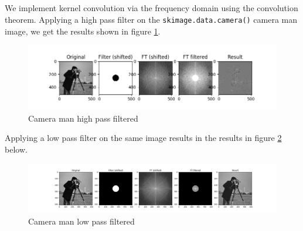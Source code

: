 \documentclass[]{article}
\begin{document}
\subsection{}
We implement kernel convolution via the frequency domain using the convolution theorem. Applying a high pass filter on the \texttt{skimage.data.camera()} camera man image, we get the results shown in figure \ref{fig:cameraman_hp}.
\begin{figure}[H]
\centering
\includegraphics[width=\textwidth]{camera_hp_verbose}
\caption{Camera man high pass filtered}
\label{fig:cameraman_hp}
\end{figure}
Applying a low pass filter on the same image results in the results in figure \ref{fig:cameraman_lp} below.
\begin{figure}[H]
\centering
\includegraphics[width=\textwidth]{camera_lp_verbose}
\caption{Camera man low pass filtered}
\label{fig:cameraman_lp}
\end{figure}
\end{document}
